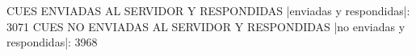 CUES ENVIADAS AL SERVIDOR Y RESPONDIDAS
|enviadas y respondidas|: 3071
CUES NO ENVIADAS AL SERVIDOR Y RESPONDIDAS
|no enviadas y respondidas|: 3968